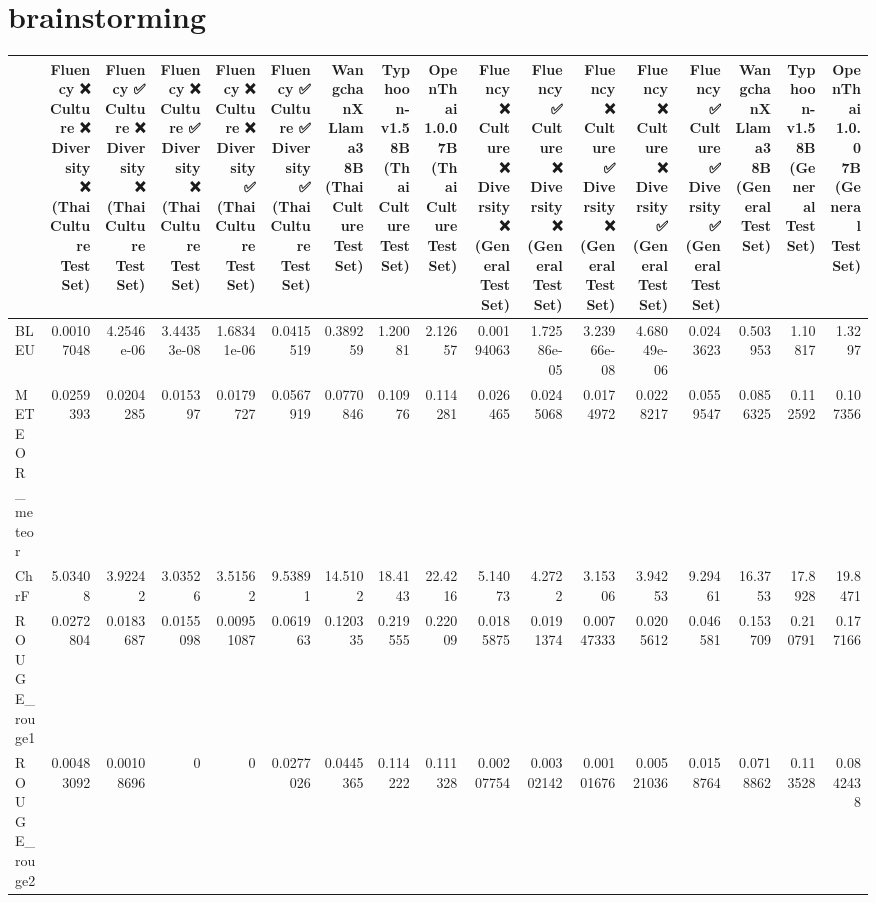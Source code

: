 \section{brainstorming}
\begin{tabular}{lrrrrrrrrrrrrrrrr}
\hline
                 &            Fluency ❌
 Culture ❌
 Diversity ❌
(Thai Culture Test Set) &            Fluency ✅
 Culture ❌
 Diversity ❌
(Thai Culture Test Set) &             Fluency ❌
 Culture ✅
 Diversity ❌
(Thai Culture Test Set) &             Fluency ❌
 Culture ❌
 Diversity ✅
(Thai Culture Test Set) &           Fluency ✅
 Culture ✅
 Diversity ✅
(Thai Culture Test Set) &            WangchanX Llama3 8B
(Thai Culture Test Set) &           Typhoon-v1.5 8B
(Thai Culture Test Set) &           OpenThai 1.0.0 7B
(Thai Culture Test Set) &            Fluency ❌
 Culture ❌
 Diversity ❌
(General Test Set) &             Fluency ✅
 Culture ❌
 Diversity ❌
(General Test Set) &             Fluency ❌
 Culture ✅
 Diversity ❌
(General Test Set) &             Fluency ❌
 Culture ❌
 Diversity ✅
(General Test Set) &           Fluency ✅
 Culture ✅
 Diversity ✅
(General Test Set) &            WangchanX Llama3 8B
(General Test Set) &           Typhoon-v1.5 8B
(General Test Set) &            OpenThai 1.0.0 7B
(General Test Set) \\
\hline
 BLEU            & 0.00107048 & 4.2546e-06 & 3.44353e-08 & 1.68341e-06 & 0.0415519 &  0.389259  &  1.20081  &  2.12657  & 0.00194063 & 1.72586e-05 & 3.23966e-08 & 4.68049e-06 & 0.0243623 &  0.503953  &  1.10817  &  1.3297    \\
 METEOR_meteor   & 0.0259393  & 0.0204285  & 0.015397    & 0.0179727   & 0.0567919 &  0.0770846 &  0.10976  &  0.114281 & 0.026465   & 0.0245068   & 0.0174972   & 0.0228217   & 0.0559547 &  0.0856325 &  0.112592 &  0.107356  \\
 ChrF            & 5.03408    & 3.92242    & 3.03526     & 3.51562     & 9.53891   & 14.5102    & 18.4143   & 22.4216   & 5.14073    & 4.2722      & 3.15306     & 3.94253     & 9.29461   & 16.3753    & 17.8928   & 19.8471    \\
 ROUGE_rouge1    & 0.0272804  & 0.0183687  & 0.0155098   & 0.00951087  & 0.061963  &  0.120335  &  0.219555 &  0.22009  & 0.0185875  & 0.0191374   & 0.00747333  & 0.0205612   & 0.046581  &  0.153709  &  0.210791 &  0.177166  \\
 ROUGE_rouge2    & 0.00483092 & 0.00108696 & 0           & 0           & 0.0277026 &  0.0445365 &  0.114222 &  0.111328 & 0.00207754 & 0.00302142  & 0.00101676  & 0.00521036  & 0.0158764 &  0.0718862 &  0.113528 &  0.0842438 \\

\end{tabular}
